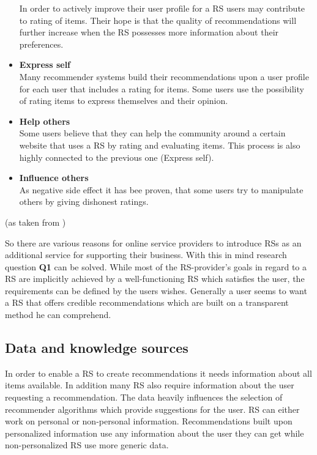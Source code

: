 \begin{itemize}
        In order to actively improve their user profile for a RS users may contribute to rating of items.
        Their hope is that the quality of recommendations will further increase when the RS possesses more information about their preferences.
    \item\textbf{Express self}\hfill\\
        Many recommender systems build their recommendations upon a user profile for each user that includes a rating for items.
        Some users use the possibility of rating items to express themselves and their opinion.
    \item\textbf{Help others}\hfill\\
        Some users believe that they can help the community around a certain website that uses a RS by rating and evaluating items.
        This process is also highly connected to the previous one (Express self).
    \item\textbf{Influence others}\hfill\\
        As negative side effect it has bee proven, that some users try to manipulate others by giving dishonest ratings.
\end{itemize}
(as taken from \citep[p.~13-17]{herlocker:2004})

So there are various reasons for online service providers to introduce RSs as an additional service for supporting their business.
With this in mind research question \textbf{Q1} can be solved.
While most of the RS-provider's goals in regard to a RS are implicitly achieved by a well-functioning RS which satisfies the user, the requirements can be defined by the users wishes.
Generally a user seems to want a RS that offers credible recommendations which are built on a transparent method he can comprehend.



\subsection{Data and knowledge sources}
\label{sec:data-knowledge-source}
In order to enable a RS to create recommendations it needs information about all items available.
In addition many RS also require information about the user requesting a recommendation.
The data heavily influences the selection of recommender algorithms which provide suggestions for the user.
\citep[p.~7-8]{ricci:2011}
RS can either work on personal or non-personal information.
Recommendations built upon personalized information use any information about the user they can get while non-personalized RS use more generic data.

